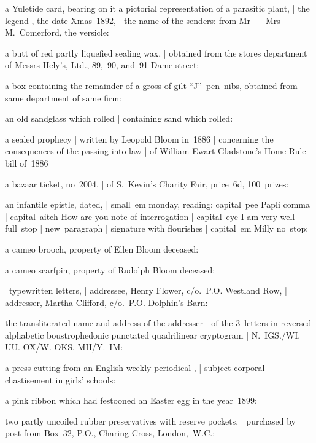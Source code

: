 \Household
a Yuletide card,
bearing on it a pictorial representation of a parasitic plant, |
the legend ,
the date Xmas~1892, |
the name of the senders:
from Mr~+~Mrs M.~Comerford,
the versicle:

\Philosophy
a butt of red partly liquefied sealing wax, |
obtained from the stores department of Messrs Hely's, Ltd.,
89,~90, and~91 Dame street:

\Poetry
a box containing the remainder of a gross of gilt ``J''~pen~nibs,
obtained from same department of same firm:

\Science
an old sandglass which rolled |
containing sand which rolled:

\Memories
a sealed prophecy
 |
written by Leopold Bloom in~1886 |
concerning the consequences of the passing into law |
of William Ewart Gladstone's Home Rule bill of~1886

\Religious
a bazaar ticket, no~2004, |
of S.~Kevin's Charity Fair, price~6d, 100~prizes:

\Places
an infantile epistle, dated, |
small~em monday, reading:
capital~pee Papli comma |
capital~aitch How are you note of interrogation |
capital~eye I am very well full~stop |
new~paragraph |
signature with flourishes |
capital~em Milly no~stop:

\Science
a cameo brooch, property of Ellen Bloom
 deceased:

\Household
a cameo scarfpin, property of Rudolph Bloom
deceased:

~typewritten letters, |
addressee, Henry Flower, c/o.~P.O. Westland Row, |
addresser, Martha Clifford, c/o.~P.O. Dolphin's Barn:

\Factual
the transliterated name and address of the addresser |
of the 3~letters in reversed alphabetic boustrophedonic punctated quadrilinear cryptogram
 |
N.~IGS./WI. UU. OX/W. OKS. MH/Y.~IM:

\Religious
a press cutting from an English weekly periodical , |
subject corporal chastisement in girls' schools:

\Memories
a pink ribbon which had festooned an Easter egg in the year~1899:

\Philosophy
two partly uncoiled rubber preservatives with reserve pockets, |
purchased by post from Box~32, P.O., Charing Cross, London,~W.C.:


